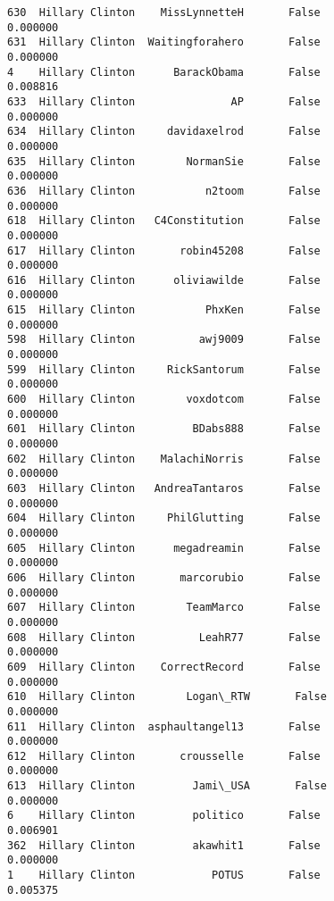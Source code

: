\documentclass[11pt]{article}
\begin{document}
\begin{Verbatim}[commandchars=\\\{\}]
630  Hillary Clinton    MissLynnetteH       False                0.000000   
631  Hillary Clinton  Waitingforahero       False                0.000000   
4    Hillary Clinton      BarackObama       False                0.008816   
633  Hillary Clinton               AP       False                0.000000   
634  Hillary Clinton     davidaxelrod       False                0.000000   
635  Hillary Clinton        NormanSie       False                0.000000   
636  Hillary Clinton           n2toom       False                0.000000   
618  Hillary Clinton   C4Constitution       False                0.000000   
617  Hillary Clinton       robin45208       False                0.000000   
616  Hillary Clinton      oliviawilde       False                0.000000   
615  Hillary Clinton           PhxKen       False                0.000000   
598  Hillary Clinton          awj9009       False                0.000000   
599  Hillary Clinton     RickSantorum       False                0.000000   
600  Hillary Clinton        voxdotcom       False                0.000000   
601  Hillary Clinton         BDabs888       False                0.000000   
602  Hillary Clinton    MalachiNorris       False                0.000000   
603  Hillary Clinton   AndreaTantaros       False                0.000000   
604  Hillary Clinton     PhilGlutting       False                0.000000   
605  Hillary Clinton      megadreamin       False                0.000000   
606  Hillary Clinton       marcorubio       False                0.000000   
607  Hillary Clinton        TeamMarco       False                0.000000   
608  Hillary Clinton          LeahR77       False                0.000000   
609  Hillary Clinton    CorrectRecord       False                0.000000   
610  Hillary Clinton        Logan\_RTW       False                0.000000   
611  Hillary Clinton  asphaultangel13       False                0.000000   
612  Hillary Clinton       crousselle       False                0.000000   
613  Hillary Clinton         Jami\_USA       False                0.000000   
6    Hillary Clinton         politico       False                0.006901   
362  Hillary Clinton         akawhit1       False                0.000000   
1    Hillary Clinton            POTUS       False                0.005375   


\end{Verbatim}
\end{document}
